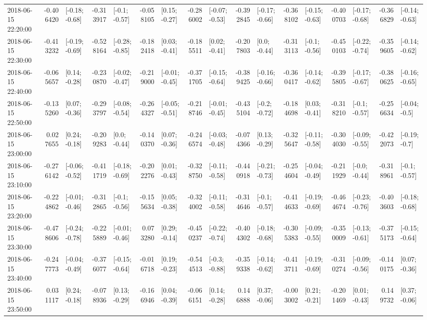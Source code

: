 \begin{tabular}{lrlrlrlrlrlrlrlrl}
2018-06-15 22:20:00 & -0.406420 &  [-0.18; -0.68] & -0.313917 &   [-0.1; -0.57] & -0.058105 &   [0.15; -0.27] & -0.286002 &  [-0.07; -0.53] & -0.392845 &  [-0.17; -0.66] & -0.368102 &  [-0.15; -0.63] & -0.400703 &  [-0.17; -0.68] & -0.366829 &  [-0.14; -0.63] \\
2018-06-15 22:30:00 & -0.413232 &  [-0.19; -0.69] & -0.528164 &  [-0.28; -0.85] & -0.182418 &   [0.03; -0.41] & -0.185511 &   [0.02; -0.41] & -0.207803 &    [0.0; -0.44] & -0.313113 &   [-0.1; -0.56] & -0.450103 &  [-0.22; -0.74] & -0.359605 &  [-0.14; -0.62] \\
2018-06-15 22:40:00 & -0.065657 &   [0.14; -0.28] & -0.230870 &  [-0.02; -0.47] & -0.219000 &  [-0.01; -0.45] & -0.371705 &  [-0.15; -0.64] & -0.389425 &  [-0.16; -0.66] & -0.360417 &  [-0.14; -0.62] & -0.395805 &  [-0.17; -0.67] & -0.380625 &  [-0.16; -0.65] \\
2018-06-15 22:50:00 & -0.135260 &   [0.07; -0.36] & -0.293797 &  [-0.08; -0.54] & -0.264327 &  [-0.05; -0.51] & -0.218746 &  [-0.01; -0.45] & -0.435104 &   [-0.2; -0.72] & -0.184698 &   [0.03; -0.41] & -0.318210 &   [-0.1; -0.57] & -0.256634 &   [-0.04; -0.5] \\
2018-06-15 23:00:00 &  0.027655 &   [0.24; -0.18] & -0.209283 &    [0.0; -0.44] & -0.140370 &   [0.07; -0.36] & -0.246574 &  [-0.03; -0.48] & -0.074366 &   [0.13; -0.29] & -0.325647 &  [-0.11; -0.58] & -0.304030 &  [-0.09; -0.55] & -0.422073 &   [-0.19; -0.7] \\
2018-06-15 23:10:00 & -0.276142 &  [-0.06; -0.52] & -0.411719 &  [-0.18; -0.69] & -0.202276 &   [0.01; -0.43] & -0.328750 &  [-0.11; -0.58] & -0.440918 &  [-0.21; -0.73] & -0.254604 &  [-0.04; -0.49] & -0.211929 &   [-0.0; -0.44] & -0.318961 &   [-0.1; -0.57] \\
2018-06-15 23:20:00 & -0.224862 &  [-0.01; -0.46] & -0.312865 &   [-0.1; -0.56] & -0.155634 &   [0.05; -0.38] & -0.324002 &  [-0.11; -0.58] & -0.314646 &   [-0.1; -0.57] & -0.414633 &  [-0.19; -0.69] & -0.464674 &  [-0.23; -0.76] & -0.403603 &  [-0.18; -0.68] \\
2018-06-15 23:30:00 & -0.478606 &  [-0.24; -0.78] & -0.225889 &  [-0.01; -0.46] &  0.073280 &   [0.29; -0.14] & -0.450237 &  [-0.22; -0.74] & -0.404302 &  [-0.18; -0.68] & -0.305383 &  [-0.09; -0.55] & -0.350009 &  [-0.13; -0.61] & -0.375173 &  [-0.15; -0.64] \\
2018-06-15 23:40:00 & -0.247773 &  [-0.04; -0.49] & -0.376077 &  [-0.15; -0.64] & -0.016718 &   [0.19; -0.23] & -0.544513 &   [-0.3; -0.88] & -0.359338 &  [-0.14; -0.62] & -0.413711 &  [-0.19; -0.69] & -0.310274 &  [-0.09; -0.56] & -0.140175 &   [0.07; -0.36] \\
2018-06-15 23:50:00 &  0.031117 &   [0.24; -0.18] & -0.078936 &   [0.13; -0.29] & -0.166946 &   [0.04; -0.39] & -0.066151 &   [0.14; -0.28] &  0.146888 &   [0.37; -0.06] & -0.003002 &   [0.21; -0.21] & -0.201469 &   [0.01; -0.43] &  0.149732 &   [0.37; -0.06] \\
\bottomrule
\end{tabular}
